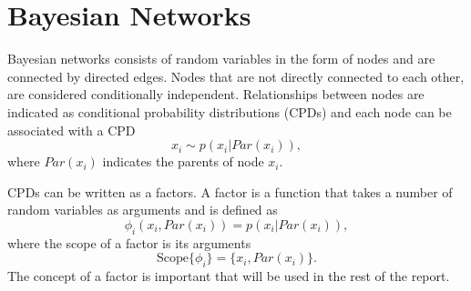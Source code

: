 \documentclass[12pt,oneside,openany,a4paper, %
afrikaans,english,
]{memoir}
\numberwithin{equation}{chapter}
\begin{document}
{\section{Bayesian Networks}
Bayesian networks consists of random variables in the form of nodes and are connected by directed edges. Nodes that are not directly connected to each other, are considered conditionally independent. Relationships between nodes are indicated as conditional probability distributions (CPDs) and each node can be associated with a CPD
\begin{equation}
x_i \sim p(x_i|Par(x_i)),
\end{equation}
where $Par(x_i)$ indicates the parents of node $x_i$.

CPDs can be written as a factors. A factor is a function that takes a number of random variables as arguments and is defined as
\begin{equation}
\phi_i(x_i, Par(x_i)) = p(x_i|Par(x_i)),
\end{equation}
where the scope of a factor is its arguments 
\begin{equation}
\text{Scope}\{\phi_i\} = \{x_i, Par(x_i)\}.
\end{equation}
The concept of a factor is important that will be used in the rest of the report.

}
\end{document}
